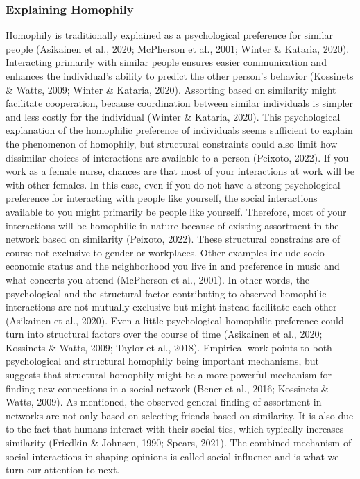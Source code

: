 \documentclass{article}
\begin{document}
\subsubsection{Explaining Homophily}
Homophily is traditionally explained as a psychological preference for similar people (Asikainen et al., 2020; McPherson et al., 2001; Winter \& Kataria, 2020). Interacting primarily with similar people ensures easier communication and enhances the individual’s ability to predict the other person’s behavior (Kossinets \& Watts, 2009; Winter \& Kataria, 2020). Assorting based on similarity might facilitate cooperation, because coordination between similar individuals is simpler and less costly for the individual (Winter \& Kataria, 2020). This psychological explanation of the homophilic preference of individuals seems sufficient to explain the phenomenon of homophily, but structural constraints could also limit how dissimilar choices of interactions are available to a person (Peixoto, 2022). If you work as a female nurse, chances are that most of your interactions at work will be with other females. In this case, even if you do not have a strong psychological preference for interacting with people like yourself, the social interactions available to you might primarily be people like yourself. Therefore, most of your interactions will be homophilic in nature because of existing assortment in the network based on similarity (Peixoto, 2022). These structural constrains are of course not exclusive to gender or workplaces. Other examples include socio-economic status and the neighborhood you live in and preference in music and what concerts you attend (McPherson et al., 2001). In other words, the psychological and the structural factor contributing to observed homophilic interactions are not mutually exclusive but might instead facilitate each other (Asikainen et al., 2020). Even a little psychological homophilic preference could turn into structural factors over the course of time (Asikainen et al., 2020; Kossinets \& Watts, 2009; Taylor et al., 2018). Empirical work points to both psychological and structural homophily being important mechanisms, but suggests that structural homophily might be a more powerful mechanism for finding new connections in a social network (Bener et al., 2016; Kossinets \& Watts, 2009).
As mentioned, the observed general finding of assortment in networks are not only based on selecting friends based on similarity. It is also due to the fact that humans interact with their social ties, which typically increases similarity (Friedkin \& Johnsen, 1990; Spears, 2021). The combined mechanism of social interactions in shaping opinions is called social influence and is what we turn our attention to next. 
\end{document}
